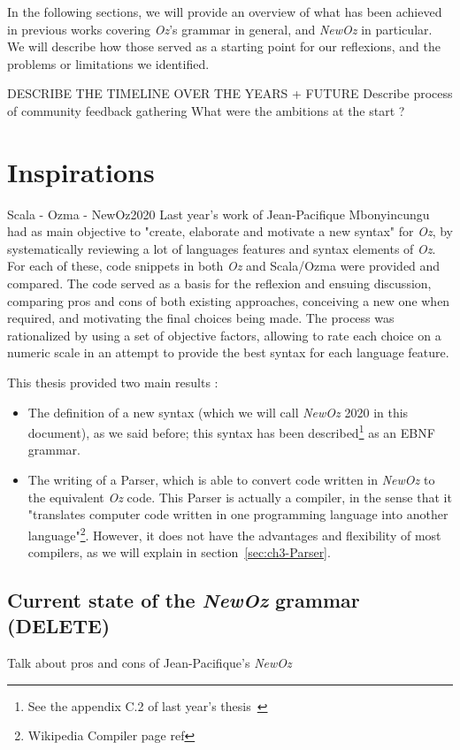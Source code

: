 In the following sections, we will provide an overview of what has been achieved in previous works covering \textit{Oz}'s grammar in general, and \textit{NewOz} in particular.
We will describe how those served as a starting point for our reflexions, and the problems or limitations we identified.\newline

DESCRIBE THE TIMELINE OVER THE YEARS + FUTURE
Describe process of community feedback gathering
What were the ambitions at the start ?

\section{Inspirations}\label{sec:ch1-2}
Scala - Ozma - NewOz2020
Last year's work of Jean-Pacifique Mbonyincungu had as main objective to "create, elaborate and motivate a new syntax"\cite{jpthesis} for \textit{Oz}, by systematically reviewing a lot of languages features and syntax elements of \textit{Oz}.
For each of these, code snippets in both \textit{Oz} and Scala/Ozma were provided and compared.
The code served as a basis for the reflexion and ensuing discussion, comparing pros and cons of both existing approaches, conceiving a new one when required, and motivating the final choices being made.
The process was rationalized by using a set of objective factors, allowing to rate each choice on a numeric scale in an attempt to provide the best syntax for each language feature.\newline

This thesis provided two main results :
\begin{itemize}
    \item The definition of a new syntax (which we will call \textit{NewOz} 2020 in this document), as we said before;
    this syntax has been described\footnote{See the appendix C.2 of last year's thesis~\cite{jpthesis}} as an EBNF grammar.
    \item The writing of a Parser, which is able to convert code written in \textit{NewOz} to the equivalent \textit{Oz} code.
    This Parser is actually a compiler, in the sense that it "translates computer code written in one programming language into another language"\footnote{Wikipedia Compiler page ref}.
    However, it does not have the advantages and flexibility of most compilers, as we will explain in section~\ref{sec:ch3-Parser}.
\end{itemize}

\subsection{Current state of the \textit{NewOz} grammar (DELETE)}\label{subsec:ch1CurrentGrammar}
Talk about pros and cons of Jean-Pacifique's \textit{NewOz}

